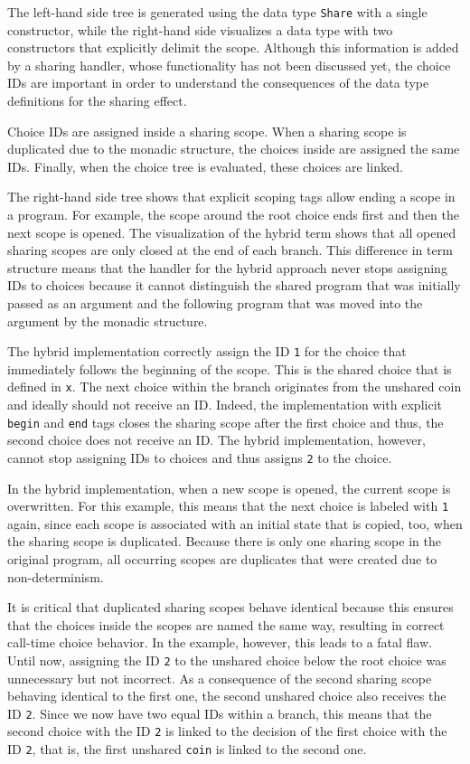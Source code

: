\documentclass[a4paper, 11pt, fleqn, twoside, abstract=on]{scrreprt}
\newcommand{\hinl}[1]{\texttt{#1}}
\begin{document}
\vspace{0.32cm}
\noindent
The left-hand side tree is generated using the data type \hinl{Share} with a single constructor, while the right-hand side visualizes a data type with two constructors that explicitly delimit the scope.
Although this information is added by a sharing handler, whose functionality has not been discussed yet, the choice IDs are important in order to understand the consequences of the data type definitions for the sharing effect.

Choice IDs are assigned inside a sharing scope.
When a sharing scope is duplicated due to the monadic structure, the choices inside are assigned the same IDs.
Finally, when the choice tree is evaluated, these choices are linked.

The right-hand side tree shows that explicit scoping tags allow ending a scope in a program.
For example, the scope around the root choice ends first and then the next scope is opened.
The visualization of the hybrid term shows that all opened sharing scopes are only closed at the end of each branch.
This difference in term structure means that the handler for the hybrid approach never stops assigning IDs to choices because it cannot distinguish the shared program that was initially passed as an argument and the following program that was moved into the argument by the monadic structure.

The hybrid implementation correctly assign the ID \hinl{1} for the choice that immediately follows the beginning of the scope.
This is the shared choice that is defined in \hinl{x}.
The next choice within the branch originates from the unshared coin and ideally should not receive an ID.
Indeed, the implementation with explicit \hinl{begin} and \hinl{end} tags closes the sharing scope after the first choice and thus, the second choice does not receive an ID.
The hybrid implementation, however, cannot stop assigning IDs to choices and thus assigns \hinl{2} to the choice.

In the hybrid implementation, when a new scope is opened, the current scope is overwritten.
For this example, this means that the next choice is labeled with \hinl{1} again, since each scope is associated with an initial state that is copied, too, when the sharing scope is duplicated.
Because there is only one sharing scope in the original program, all occurring scopes are duplicates that were created due to non-determinism.

It is critical that duplicated sharing scopes behave identical because this ensures that the choices inside the scopes are named the same way, resulting in correct call-time choice behavior.
In the example, however, this leads to a fatal flaw.
Until now, assigning the ID \hinl{2} to the unshared choice below the root choice was unnecessary but not incorrect.
As a consequence of the second sharing scope behaving identical to the first one, the second unshared choice also receives the ID \hinl{2}.
Since we now have two equal IDs within a branch, this means that the second choice with the ID \hinl{2} is linked to the decision of the first choice with the ID \hinl{2}, that is, the first unshared \hinl{coin} is linked to the second one.
\end{document}
